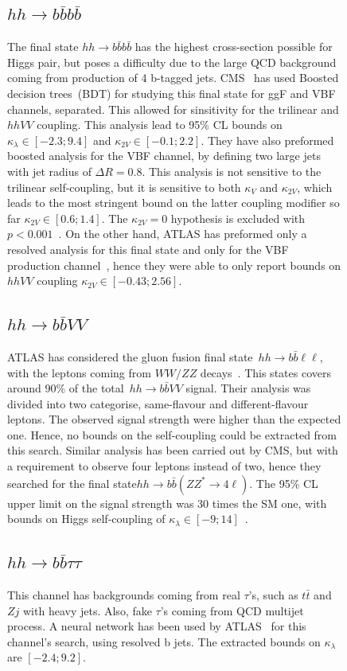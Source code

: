 \begin{figure}[!htpb]
\subsection*{$hh \to b\bar b b \bar b $}
 The final state $ hh \to b\bar b b \bar b$ has the highest cross-section possible for Higgs pair, but poses a difficulty due to the large QCD background  coming from production of 4 b-tagged jets. CMS~\cite{CMS-PAS-HIG-20-005} has used Boosted decision trees~(BDT) for studying this final state for ggF and VBF channels, separated. This allowed for sinsitivity for the trilinear and $hhVV$ coupling. This analysis lead to 95\% CL bounds on $\kappa_\lambda \in [-2.3;9.4]$ and $\kappa_{2V} \in [-0.1; 2.2]$.  They have also preformed boosted analysis for the VBF channel, by defining two large jets with jet radius of $\Delta R =0.8$. This analysis is not sensitive to the trilinear self-coupling, but it is sensitive to both $\kappa_V$ and  $\kappa_{2V} $, which leads to the most stringent bound on the latter coupling modifier so far  $\kappa_{2V}  \in [0.6;1.4]$. The $\kappa_{2V}=0$ hypothesis is excluded with $ p<0.001$~\cite{CMS-PAS-B2G-21-001}. On the other hand, ATLAS has preformed only a resolved analysis for this final state and only for the VBF production channel~\cite{ATLAS:2020jgy}, hence they were able to only report bounds on $hhVV$ coupling $\kappa_{2V} \in [-0.43;2.56]$. 
\subsection*{$hh \to b\bar b VV $}
ATLAS has considered the gluon fusion final state~$hh \to b\bar b \ell \ell$, with the leptons coming from $WW/ZZ$ decays~\cite{ATLAS:2019vwv}. This states covers around $90\%$ of the total~$hh \to b\bar b VV $ signal. Their analysis was divided into two categorise, same-flavour and different-flavour leptons. The observed signal strength were higher than the expected one. Hence, no bounds on the self-coupling could be extracted from this search. Similar analysis has been carried out by CMS, but with a requirement to observe four leptons instead of two, hence they searched for the final state$hh \to b\bar b( ZZ^*\to 4\ell)$. The 95\% CL upper limit on the signal strength was 30 times the SM one, with bounds on Higgs self-coupling of $\kappa_\lambda \in [-9;14]$~\cite{CMS-PAS-HIG-20-004}. 
\subsection*{$hh \to b\bar b \tau \tau $}
This channel has backgrounds coming from real $\tau$'s, such as $t\bar t$ and $Z j$ with heavy jets. Also, fake $\tau$'s coming from QCD multijet process. A neural network has been used by ATLAS~\cite{ATLAS-CONF-2021-052} for this channel's search, using resolved b jets. The extracted bounds on $\kappa_\lambda$ are $[-2.4;9.2]$. 

\end{figure}
